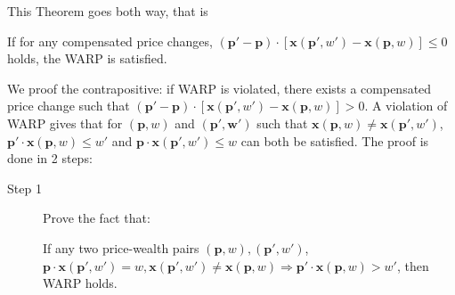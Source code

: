 This Theorem goes both way, that is
\begin{theorem}\label{thm_lawofdemand_to_WARP}
    If for any compensated price changes, $(\mathbf{p}'-\mathbf{p})\cdot[\mathbf{x}(\mathbf{p}',w')-\mathbf{x}(\mathbf{p},w)]\leq 0$ holds, the WARP is satisfied.
\end{theorem}
We proof the contrapositive: if WARP is violated, there exists a compensated price change such that $(\mathbf{p}'-\mathbf{p})\cdot[\mathbf{x}(\mathbf{p}',w')-\mathbf{x}(\mathbf{p},w)]>0$. A violation of WARP gives that for $(\mathbf{p},w)$ and $(\mathbf{\mathbf{p}',w'})$ such that $\mathbf{x}(\mathbf{p},w)\neq \mathbf{x}(\mathbf{p}',w')$, $\mathbf{p}'\cdot \mathbf{x}(\mathbf{p},w)\leq w'$ and $\mathbf{p}\cdot \mathbf{x}(\mathbf{p}',w')\leq w$ can both be satisfied. The proof is done in 2 steps:
\begin{description}
    \item[Step 1] Prove the fact that: 
    
    If any two price-wealth pairs $(\mathbf{p},w),(\mathbf{p}',w')$, $\mathbf{p}\cdot\mathbf{x}(\mathbf{p}',w')=w,\mathbf{x}(\mathbf{p}',w')\neq \mathbf{x}(\mathbf{p},w)\Rightarrow \mathbf{p}'\cdot \mathbf{x}(\mathbf{p},w)>w'$, then WARP holds. 
    

\end{description}
